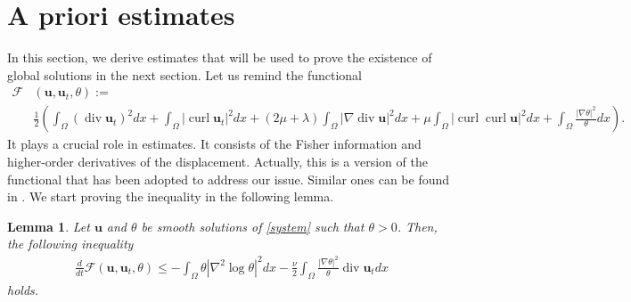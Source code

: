 \documentclass[11pt]{article}
\numberwithin{equation}{section}
\theoremstyle{plain}
\newtheorem{lem}[defi]{Lemma}
\newcommand\bb[1]{\mathbf{#1}}
\newcommand{\io}{\int_{\Omega}}
\newcommand{\ul}{\frac{1}{2}}
\newcommand{\ddt}{\frac{d}{dt}}
\renewcommand{\div}{\operatorname{div}}
\DeclareMathOperator{\curl}{curl}
\newcommand{\F}{\mathcal{F}}
\newcommand{\wspnd}{2\mu+\lambda}
\newcommand{\bu}{\bb{u}}
\begin{document}
\section{A priori estimates}\label{druga}
In this section, we derive estimates that will be used to prove the existence of global solutions in the next section. Let us remind the functional 
\begin{align*}
\F&(\bu,\bu_t,\theta):=\\
&\ul\left(\io (\div \bu_t)^2dx+\io |\curl \bu_t|^2dx+(\wspnd)\io|\nabla\div \bu|^2dx+\mu\io|\curl\curl\bu|^2dx+\io\frac{|\nabla\theta|^2}{\theta}dx\right).
\end{align*}
It plays a crucial role in estimates. It consists of the Fisher information and higher-order derivatives of the displacement. Actually, this is a version of the functional that has been adopted to address our issue. Similar ones can be found in \cite{BC, Biest, BC2}. We start proving the inequality in the following lemma.
\begin{lem}\label{wonderfulformula}
Let $\bu$ and $\theta$ be smooth solutions of \eqref{system} such that $\theta>0$. Then, the following inequality
\begin{align*}
\ddt\F(\bu,\bu_t,\theta)
\leq-\io\theta|\nabla^2\log\theta|^2dx-\frac\nu2\io\frac{|\nabla\theta|^2}\theta\div \bu_tdx
\end{align*}
holds.
\end{lem}
\end{document}
